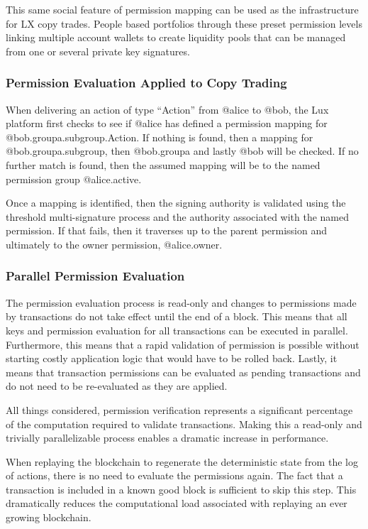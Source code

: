 \documentclass[11pt]{article}
\begin{document}
This same social feature of permission mapping can be used as the infrastructure for LX copy trades. People based portfolios through these preset permission levels linking multiple account wallets to create liquidity pools that can be managed from one or several private key signatures.


\subsubsection{Permission Evaluation Applied to Copy Trading}

When delivering an action of type ``Action'' from @alice to @bob, the Lux  platform first checks to see if @alice has defined a permission mapping for @bob.groupa.subgroup.Action. If nothing is found, then a mapping for @bob.groupa.subgroup, then @bob.groupa and lastly @bob will be checked. If no further match is found, then the assumed mapping will be to the named permission group @alice.active.


Once a mapping is identified, then the signing authority is validated using the threshold multi-signature process and the authority associated with the named permission. If that fails, then it traverses up to the parent permission and ultimately to the owner permission, @alice.owner.


\subsubsection{Parallel Permission Evaluation}

The permission evaluation process is read-only and changes to permissions made by transactions do not take effect until the end of a block. This means that all keys and permission evaluation for all transactions can be executed in parallel. Furthermore, this means that a rapid validation of permission is possible without starting costly application logic that would have to be rolled back. Lastly, it means that transaction permissions can be evaluated as pending transactions and do not need to be re-evaluated as they are applied.


All things considered, permission verification represents a significant percentage of the computation required to validate transactions. Making this a read-only and trivially parallelizable process enables a dramatic increase in performance.


When replaying the blockchain to regenerate the deterministic state from the log of actions, there is no need to evaluate the permissions again. The fact that a transaction is included in a known good block is sufficient to skip this step. This dramatically reduces the computational load associated with replaying an ever growing blockchain.
\end{document}
